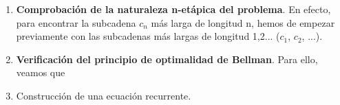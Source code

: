 \begin{enumerate}
    \item \textbf{Comprobación de la naturaleza n-etápica del problema}. En efecto, 
    para encontrar la subcadena $c_n$ más larga de longitud n, hemos de empezar 
    previamente con las subcadenas más largas de longitud 1,2... ($c_1$, $c_2$, ...). 

    \item \textbf{Verificación del principio de optimalidad de Bellman}. Para ello, 
    veamos que 
    \item Construcción de una ecuación recurrente. 
\end{enumerate}





